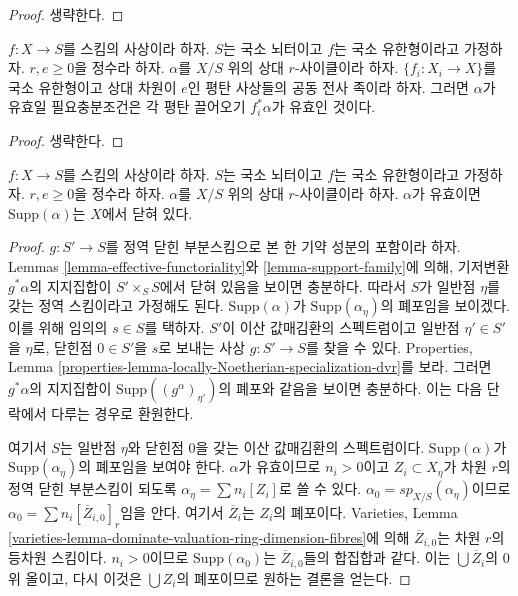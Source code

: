 \begin{proof}
생략한다.
\end{proof}

\begin{lemma}
\label{lemma-effective-descent-pullbacks}
$f : X \to S$를 스킴의 사상이라 하자. $S$는 국소 뇌터이고 $f$는
국소 유한형이라고 가정하자. $r, e \geq 0$을 정수라 하자. $\alpha$를
$X/S$ 위의 상대 $r$-사이클이라 하자. $\{f_i : X_i \to X\}$를 국소
유한형이고 상대 차원이 $e$인 평탄 사상들의 공동 전사 족이라 하자.
그러면 $\alpha$가 유효일 필요충분조건은 각 평탄 끌어오기
$f_i^*\alpha$가 유효인 것이다.
\end{lemma}

\begin{proof}
생략한다.
\end{proof}

\begin{lemma}
\label{lemma-effective-support-closed}
$f : X \to S$를 스킴의 사상이라 하자. $S$는 국소 뇌터이고 $f$는
국소 유한형이라고 가정하자. $r, e \geq 0$을 정수라 하자. $\alpha$를
$X/S$ 위의 상대 $r$-사이클이라 하자. $\alpha$가 유효이면
$\text{Supp}(\alpha)$는 $X$에서 닫혀 있다.
\end{lemma}

\begin{proof}
$g : S' \to S$를 정역 닫힌 부분스킴으로 본 한 기약 성분의 포함이라
하자. Lemmas \ref{lemma-effective-functoriality}와
\ref{lemma-support-family}에 의해, 기저변환 $g^*\alpha$의 지지집합이
$S' \times_S S$에서 닫혀 있음을 보이면 충분하다. 따라서 $S$가
일반점 $\eta$를 갖는 정역 스킴이라고 가정해도 된다.
$\text{Supp}(\alpha)$가 $\text{Supp}(\alpha_\eta)$의 폐포임을 보이겠다.
이를 위해 임의의 $s \in S$를 택하자. $S'$이 이산 값매김환의
스펙트럼이고 일반점 $\eta' \in S'$을 $\eta$로, 닫힌점 $0 \in S'$을
$s$로 보내는 사상 $g : S' \to S$를 찾을 수 있다. Properties, Lemma
\ref{properties-lemma-locally-Noetherian-specialization-dvr}를 보라.
그러면 $g^*\alpha$의 지지집합이
$\text{Supp}((g^\alpha)_{\eta'})$의 폐포와 같음을 보이면 충분하다.
이는 다음 단락에서 다루는 경우로 환원한다.

\medskip\noindent
여기서 $S$는 일반점 $\eta$와 닫힌점 $0$을 갖는 이산 값매김환의
스펙트럼이다. $\text{Supp}(\alpha)$가
$\text{Supp}(\alpha_\eta)$의 폐포임을 보여야 한다. $\alpha$가
유효이므로 $n_i > 0$이고 $Z_i \subset X_\eta$가 차원 $r$의 정역
닫힌 부분스킴이 되도록 $\alpha_\eta = \sum n_i[Z_i]$로 쓸 수 있다.
$\alpha_0 = sp_{X/S}(\alpha_\eta)$이므로
$\alpha_0 = \sum n_i [\overline{Z}_{i, 0}]_r$임을 안다. 여기서
$\overline{Z}_i$는 $Z_i$의 폐포이다. Varieties, Lemma
\ref{varieties-lemma-dominate-valuation-ring-dimension-fibres}에 의해
$\overline{Z}_{i, 0}$는 차원 $r$의 등차원 스킴이다. $n_i > 0$이므로
$\text{Supp}(\alpha_0)$는 $\overline{Z}_{i, 0}$들의 합집합과 같다.
이는 $\bigcup \overline{Z}_i$의 $0$ 위 올이고, 다시 이것은
$\bigcup Z_i$의 폐포이므로 원하는 결론을 얻는다.
\end{proof}

